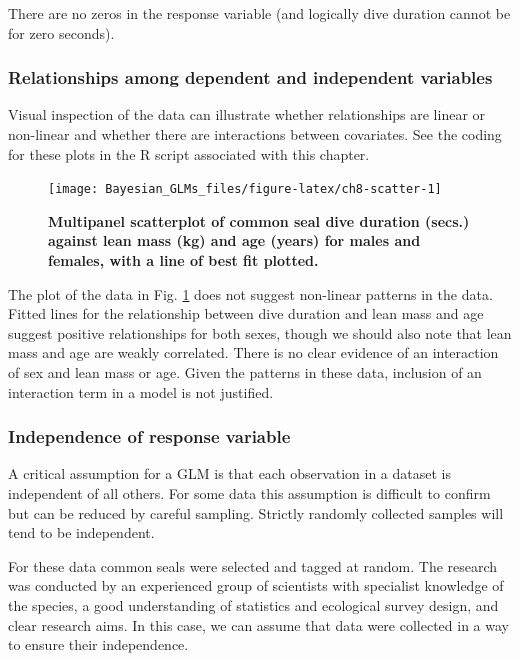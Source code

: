 \documentclass[
]{book}
\begin{document}
There are no zeros in the response variable (and logically dive duration cannot be for zero seconds).

\hypertarget{gamma-rels}{%
\subsubsection{Relationships among dependent and independent variables}\label{gamma-rels}}

Visual inspection of the data can illustrate whether relationships are linear or non-linear and whether there are interactions between covariates. See the coding for these plots in the R script associated with this chapter.



\begin{figure}

{\centering \texttt{[image: Bayesian\_GLMs\_files/figure-latex/ch8-scatter-1]} 

}

\caption{\textbf{Multipanel scatterplot of common seal dive duration (secs.) against lean mass (kg) and age (years) for males and females, with a line of best fit plotted.}}\label{fig:ch8-scatter}
\end{figure}

The plot of the data in Fig. \ref{fig:ch8-scatter} does not suggest non-linear patterns in the data. Fitted lines for the relationship between dive duration and lean mass and age suggest positive relationships for both sexes, though we should also note that lean mass and age are weakly correlated. There is no clear evidence of an interaction of sex and lean mass or age. Given the patterns in these data, inclusion of an interaction term in a model is not justified.

\hypertarget{gamma-indep}{%
\subsubsection{Independence of response variable}\label{gamma-indep}}

A critical assumption for a GLM is that each observation in a dataset is independent of all others. For some data this assumption is difficult to confirm but can be reduced by careful sampling. Strictly randomly collected samples will tend to be independent.

For these data common seals were selected and tagged at random. The research was conducted by an experienced group of scientists with specialist knowledge of the species, a good understanding of statistics and ecological survey design, and clear research aims. In this case, we can assume that data were collected in a way to ensure their independence.
\end{document}

